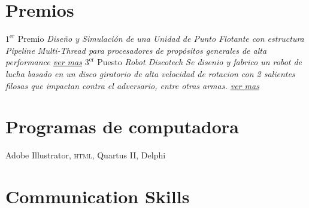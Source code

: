 \documentclass[11pt,a4paper,sans]{moderncv} %
\begin{document}
\section{Premios}
 					{$1^{\text{er}}$ Premio} {}{}{\em{Diseño y Simulación de una Unidad de Punto Flotante con estructura Pipeline Multi-Thread para procesadores de propósitos generales de alta performance} \em \newline \href{http://disenioconingenio.com.ar/shop/docs/i+d_itba_2002.pdf}{ver mas}}
	{$3^{\text{er}}$ Puesto} {}{}{\em{Robot Discotech} \newline \em{Se disenio y fabrico un robot de lucha basado en un disco giratorio de alta velocidad de rotacion con 2 salientes filosas que impactan contra el adversario, entre otras armas. \newline \href{http://disenioconingenio.com.ar/producto.php?products_id=378}{ver mas}}}
\section{Programas de computadora}

 {Adobe Illustrator, \textsc{html}, Quartus II, Delphi}


\section{Communication Skills}


\end{document}
